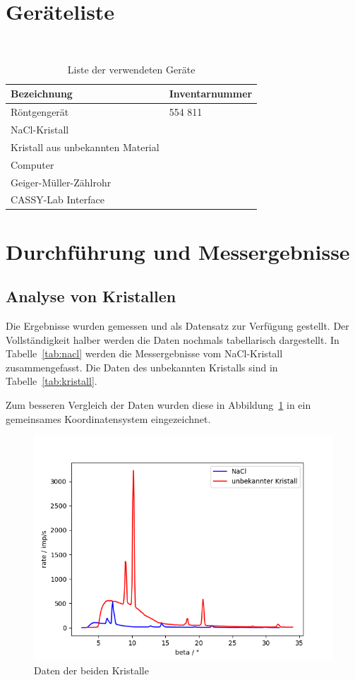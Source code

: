 \documentclass{article}
\begin{document}
\section{Geräteliste}


\begin{table}[H]
\caption{Liste der verwendeten Geräte}

~

\begin{tabular}{l|l}
Bezeichnung & Inventarnummer  \\
\hline
Röntgengerät & 554 811  \\
NaCl-Kristall &   \\
Kristall aus unbekannten Material & \\
Computer & \\
Geiger-Müller-Zählrohr & \\
CASSY-Lab Interface 
\end{tabular}

\end{table}


\section{Durchführung und Messergebnisse}

\subsection{Analyse von Kristallen}
Die Ergebnisse wurden gemessen und als Datensatz zur Verfügung gestellt. Der Vollständigkeit halber werden die Daten nochmals tabellarisch dargestellt. In Tabelle~\ref{tab:nacl} werden die Messergebnisse vom NaCl-Kristall zusammengefasst. Die Daten des unbekannten Kristalls sind in Tabelle~\ref{tab:kristall}.

Zum besseren Vergleich der Daten wurden diese in Abbildung~\ref{fig:daten} in ein gemeinsames Koordinatensystem eingezeichnet.

\begin{figure}[H]
\includegraphics[scale=1]{daten.png}
\caption{Daten der beiden Kristalle}
\label{fig:daten}
\end{figure}
\end{document}
